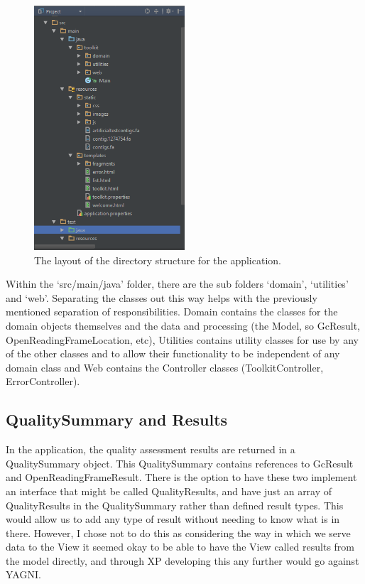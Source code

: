 \begin{figure}[H]
\centering
\includegraphics[width=0.5\textwidth]{images/directorystructure}
\caption{The layout of the directory structure for the application.}
\end{figure}

Within the `src/main/java' folder, there are the sub folders `domain', `utilities' and `web'. Separating the classes out this way helps with the previously mentioned separation of responsibilities. Domain contains the classes for the domain objects themselves and the data and processing (the Model, so GcResult, OpenReadingFrameLocation, etc), Utilities contains utility classes for use by any of the other classes and to allow their functionality to be independent of any domain class and Web contains the Controller classes (ToolkitController, ErrorController).

\subsection{QualitySummary and Results}
In the application, the quality assessment results are returned in a QualitySummary object. This QualitySummary contains references to GcResult and OpenReadingFrameResult. There is the option to have these two implement an interface that might be called QualityResults, and have just an array of QualityResults in the QualitySummary rather than defined result types. This would allow us to add any type of result without needing to know what is in there. However, I chose not to do this as considering the way in which we serve data to the View it seemed okay to be able to have the View called results from the model directly, and through XP developing this any further would go against YAGNI. 

